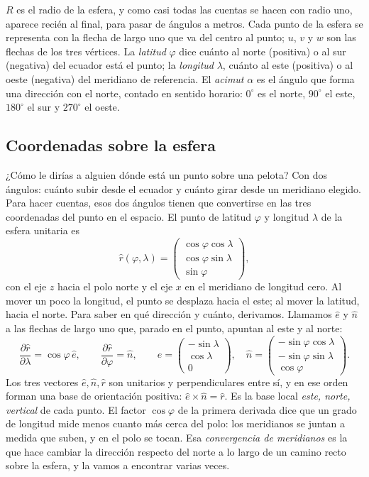 \(R\) es el radio de la esfera, y como casi todas las cuentas se hacen con radio
uno, aparece recién al final, para pasar de ángulos a metros. Cada punto de la esfera se
representa con la flecha de largo uno que va del centro al punto; \(u\), \(v\) y \(w\) son las
flechas de los tres vértices. La \emph{latitud} \(\varphi\) dice cuánto al norte (positiva) o
al sur (negativa) del ecuador está el punto; la \emph{longitud} \(\lambda\), cuánto al este
(positiva) o al oeste (negativa) del meridiano de referencia. El \emph{acimut} \(\alpha\) es el
ángulo que forma una dirección con el norte, contado en sentido horario: \(0^\circ\) es el
norte, \(90^\circ\) el este, \(180^\circ\) el sur y \(270^\circ\) el oeste.

\subsection{Coordenadas sobre la esfera}

¿Cómo le dirías a alguien dónde está un punto sobre una pelota? Con dos ángulos: cuánto subir
desde el ecuador y cuánto girar desde un meridiano elegido. Para hacer cuentas, esos dos
ángulos tienen que convertirse en las tres coordenadas del punto en el espacio. El punto de
latitud \(\varphi\) y longitud \(\lambda\) de la esfera unitaria es
\[
  \hat r(\varphi,\lambda)=
  \begin{pmatrix}\cos\varphi\cos\lambda\\ \cos\varphi\sin\lambda\\ \sin\varphi\end{pmatrix},
\]
con el eje \(z\) hacia el polo norte y el eje \(x\) en el meridiano de longitud cero. Al
mover un poco la longitud, el punto se desplaza hacia el este; al mover la latitud, hacia el
norte. Para saber en qué dirección y cuánto, derivamos. Llamamos \(\hat e\) y \(\hat n\) a las
flechas de largo uno que, parado en el punto, apuntan al este y al norte:
\[
  \frac{\partial\hat r}{\partial\lambda}=\cos\varphi\,\hat e,\qquad
  \frac{\partial\hat r}{\partial\varphi}=\hat n,\qquad
  \hat e=\begin{pmatrix}-\sin\lambda\\ \cos\lambda\\ 0\end{pmatrix},\quad
  \hat n=\begin{pmatrix}-\sin\varphi\cos\lambda\\ -\sin\varphi\sin\lambda\\ \cos\varphi\end{pmatrix}.
\]
Los tres vectores \(\hat e,\hat n,\hat r\) son unitarios y perpendiculares entre sí, y en ese
orden forman una base de orientación positiva: \(\hat e\times\hat n=\hat r\). Es la base
local \emph{este, norte, vertical} de cada punto. El factor \(\cos\varphi\) de la primera
derivada dice que un grado de longitud mide menos cuanto más cerca del polo: los meridianos
se juntan a medida que suben, y en el polo se tocan. Esa \emph{convergencia de meridianos} es
la que hace cambiar la dirección respecto del norte a lo largo de un camino recto sobre la esfera, y la vamos a
encontrar varias veces.

